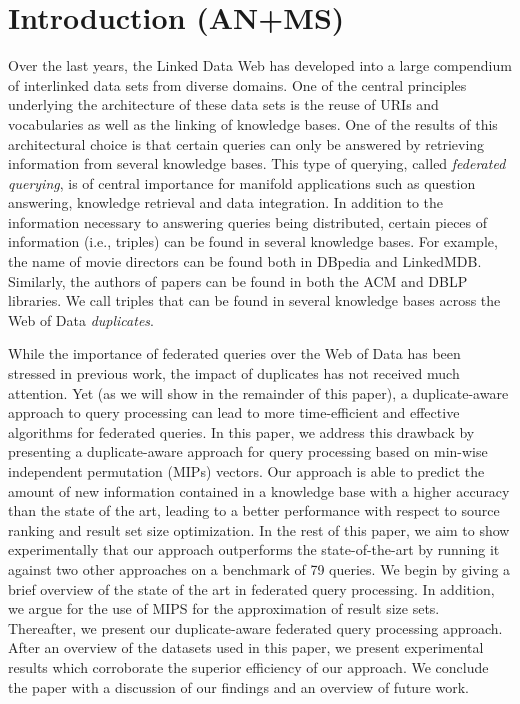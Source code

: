 \documentclass{sig-alternate}  %
\begin{document}
\section{Introduction (AN+MS)}
Over the last years, the Linked Data Web has developed into a large compendium of interlinked data sets from diverse domains. 
One of the central principles underlying the architecture of these data sets is the reuse of URIs and vocabularies as well as the linking of knowledge bases\cite{key-20}.
One of the results of this architectural choice is that certain queries can only be answered by retrieving information from several knowledge bases.
This type of querying, called \emph{federated querying}, is of central importance for manifold applications such as question answering, knowledge retrieval and data integration.
In addition to the information necessary to answering queries being distributed, certain pieces of information (i.e., triples) can be found in several knowledge bases. 
For example, the name of movie directors can be found both in DBpedia and LinkedMDB.
Similarly, the authors of papers can be found in both the ACM and DBLP libraries.
We call triples that can be found in several knowledge bases across the Web of Data \emph{duplicates}.

While the importance of federated queries over the Web of Data has been stressed in previous work, the impact of duplicates has not received much attention.
Yet (as we will show in the remainder of this paper), a duplicate-aware approach to query processing can lead to more time-efficient and effective algorithms for federated queries.
In this paper, we address this drawback by presenting a duplicate-aware approach for query processing based on min-wise independent permutation (MIPs) vectors.
Our approach is able to predict the amount of new information contained in a knowledge base with a higher accuracy than the state of the art, leading to a better performance with respect to source ranking and result set size optimization. 
In the rest of this paper, we aim to show experimentally that our approach outperforms the state-of-the-art by running it against two other approaches on a benchmark of 79 queries. 
We begin by giving a brief overview of the state of the art in federated query processing.
In addition, we argue for the use of MIPS for the approximation of result size sets.
Thereafter, we present our duplicate-aware federated query processing approach.
After an overview of the datasets used in this paper, we present experimental results which corroborate the superior efficiency of our approach.
We conclude the paper with a discussion of our findings and an overview of future work.
\end{document}
